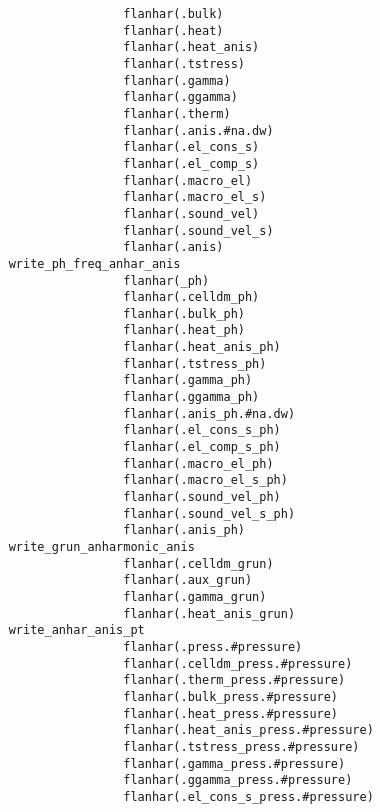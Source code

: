 \documentclass[12pt,a4paper,twoside]{report}
\begin{document}
\begin{footnotesize}
\begin{verbatim}
                                 flanhar(.bulk)
                                 flanhar(.heat)
                                 flanhar(.heat_anis)
                                 flanhar(.tstress)
                                 flanhar(.gamma)
                                 flanhar(.ggamma)
                                 flanhar(.therm)
                                 flanhar(.anis.#na.dw)
                                 flanhar(.el_cons_s)
                                 flanhar(.el_comp_s)
                                 flanhar(.macro_el)
                                 flanhar(.macro_el_s)
                                 flanhar(.sound_vel)
                                 flanhar(.sound_vel_s)
                                 flanhar(.anis)
                 write_ph_freq_anhar_anis
                                 flanhar(_ph)
                                 flanhar(.celldm_ph)
                                 flanhar(.bulk_ph)
                                 flanhar(.heat_ph)
                                 flanhar(.heat_anis_ph)
                                 flanhar(.tstress_ph)
                                 flanhar(.gamma_ph)
                                 flanhar(.ggamma_ph)
                                 flanhar(.anis_ph.#na.dw)
                                 flanhar(.el_cons_s_ph)
                                 flanhar(.el_comp_s_ph)
                                 flanhar(.macro_el_ph)
                                 flanhar(.macro_el_s_ph)
                                 flanhar(.sound_vel_ph)
                                 flanhar(.sound_vel_s_ph)
                                 flanhar(.anis_ph)
                 write_grun_anharmonic_anis
                                 flanhar(.celldm_grun)
                                 flanhar(.aux_grun)
                                 flanhar(.gamma_grun)
                                 flanhar(.heat_anis_grun)
                 write_anhar_anis_pt
                                 flanhar(.press.#pressure)
                                 flanhar(.celldm_press.#pressure)
                                 flanhar(.therm_press.#pressure)
                                 flanhar(.bulk_press.#pressure)
                                 flanhar(.heat_press.#pressure)
                                 flanhar(.heat_anis_press.#pressure)
                                 flanhar(.tstress_press.#pressure)
                                 flanhar(.gamma_press.#pressure)
                                 flanhar(.ggamma_press.#pressure)
                                 flanhar(.el_cons_s_press.#pressure)

\end{verbatim}
\end{footnotesize}
\end{document}
